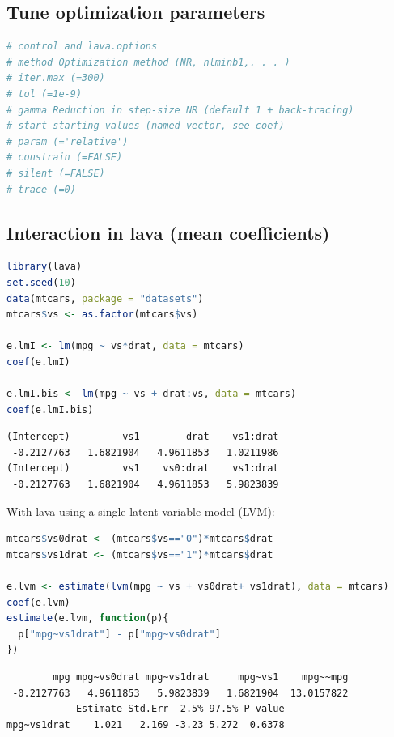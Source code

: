 \documentclass{article}
\begin{document}
\subsection{Tune optimization parameters}
\label{sec:orgd73e72f}
\begin{lstlisting}[language=r,numbers=none]
# control and lava.options
# method Optimization method (NR, nlminb1,. . . )
# iter.max (=300)
# tol (=1e-9)
# gamma Reduction in step-size NR (default 1 + back-tracing)
# start starting values (named vector, see coef)
# param (='relative')
# constrain (=FALSE)
# silent (=FALSE)
# trace (=0)
\end{lstlisting}
\subsection{Interaction in lava (mean coefficients)}
\label{sec:org8e6eb5c}

\begin{lstlisting}[language=r,numbers=none]
library(lava)
set.seed(10)
data(mtcars, package = "datasets")
mtcars$vs <- as.factor(mtcars$vs)

e.lmI <- lm(mpg ~ vs*drat, data = mtcars)
coef(e.lmI)

e.lmI.bis <- lm(mpg ~ vs + drat:vs, data = mtcars)
coef(e.lmI.bis)
\end{lstlisting}

\label{}
\begin{verbatim}
(Intercept)         vs1        drat    vs1:drat 
 -0.2127763   1.6821904   4.9611853   1.0211986
(Intercept)         vs1    vs0:drat    vs1:drat 
 -0.2127763   1.6821904   4.9611853   5.9823839
\end{verbatim}


With lava using a single latent variable model (LVM):
\begin{lstlisting}[language=r,numbers=none]
mtcars$vs0drat <- (mtcars$vs=="0")*mtcars$drat
mtcars$vs1drat <- (mtcars$vs=="1")*mtcars$drat

e.lvm <- estimate(lvm(mpg ~ vs + vs0drat+ vs1drat), data = mtcars)
coef(e.lvm)
estimate(e.lvm, function(p){
  p["mpg~vs1drat"] - p["mpg~vs0drat"]
})
\end{lstlisting}

\label{}
\begin{verbatim}
        mpg mpg~vs0drat mpg~vs1drat     mpg~vs1    mpg~~mpg 
 -0.2127763   4.9611853   5.9823839   1.6821904  13.0157822
            Estimate Std.Err  2.5% 97.5% P-value
mpg~vs1drat    1.021   2.169 -3.23 5.272  0.6378
\end{verbatim}
\end{document}
